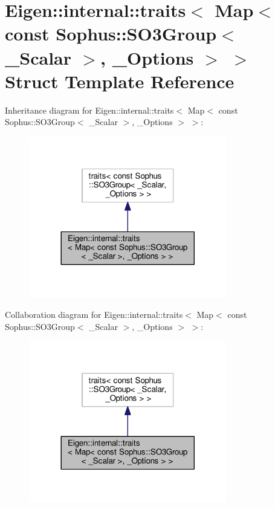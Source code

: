 \hypertarget{struct_eigen_1_1internal_1_1traits_3_01_map_3_01const_01_sophus_1_1_s_o3_group_3_01___scalar_01_4_00_01___options_01_4_01_4}{}\section{Eigen\+:\+:internal\+:\+:traits$<$ Map$<$ const Sophus\+:\+:S\+O3\+Group$<$ \+\_\+\+Scalar $>$, \+\_\+\+Options $>$ $>$ Struct Template Reference}
\label{struct_eigen_1_1internal_1_1traits_3_01_map_3_01const_01_sophus_1_1_s_o3_group_3_01___scalar_01_4_00_01___options_01_4_01_4}


Inheritance diagram for Eigen\+:\+:internal\+:\+:traits$<$ Map$<$ const Sophus\+:\+:S\+O3\+Group$<$ \+\_\+\+Scalar $>$, \+\_\+\+Options $>$ $>$\+:
\nopagebreak
\begin{figure}[H]
\begin{center}
\leavevmode
\includegraphics[width=245pt]{struct_eigen_1_1internal_1_1traits_3_01_map_3_01const_01_sophus_1_1_s_o3_group_3_01___scalar_01_3fbed213f5b350c4a602acc1636357a2}
\end{center}
\end{figure}


Collaboration diagram for Eigen\+:\+:internal\+:\+:traits$<$ Map$<$ const Sophus\+:\+:S\+O3\+Group$<$ \+\_\+\+Scalar $>$, \+\_\+\+Options $>$ $>$\+:
\nopagebreak
\begin{figure}[H]
\begin{center}
\leavevmode
\includegraphics[width=245pt]{struct_eigen_1_1internal_1_1traits_3_01_map_3_01const_01_sophus_1_1_s_o3_group_3_01___scalar_01_fcaf1bfa9f755c257921a0a3fd6432be}
\end{center}
\end{figure}
